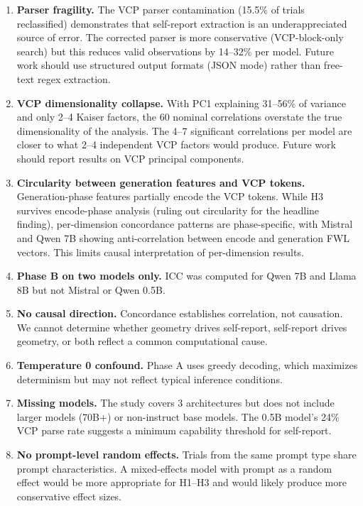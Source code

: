 \documentclass[11pt,a4paper]{article}
\begin{document}
\begin{enumerate}
    \item \textbf{Parser fragility.} The VCP parser contamination (15.5\% of trials reclassified) demonstrates that self-report extraction is an underappreciated source of error. The corrected parser is more conservative (VCP-block-only search) but this reduces valid observations by 14--32\% per model. Future work should use structured output formats (JSON mode) rather than free-text regex extraction.

    \item \textbf{VCP dimensionality collapse.} With PC1 explaining 31--56\% of variance and only 2--4 Kaiser factors, the 60 nominal correlations overstate the true dimensionality of the analysis. The 4--7 significant correlations per model are closer to what 2--4 independent VCP factors would produce. Future work should report results on VCP principal components.

    \item \textbf{Circularity between generation features and VCP tokens.} Generation-phase features partially encode the VCP tokens. While H3 survives encode-phase analysis (ruling out circularity for the headline finding), per-dimension concordance patterns are phase-specific, with Mistral and Qwen 7B showing anti-correlation between encode and generation FWL vectors. This limits causal interpretation of per-dimension results.

    \item \textbf{Phase B on two models only.} ICC was computed for Qwen 7B and Llama 8B but not Mistral or Qwen 0.5B.

    \item \textbf{No causal direction.} Concordance establishes correlation, not causation. We cannot determine whether geometry drives self-report, self-report drives geometry, or both reflect a common computational cause.

    \item \textbf{Temperature 0 confound.} Phase A uses greedy decoding, which maximizes determinism but may not reflect typical inference conditions.

    \item \textbf{Missing models.} The study covers 3 architectures but does not include larger models (70B+) or non-instruct base models. The 0.5B model's 24\% VCP parse rate suggests a minimum capability threshold for self-report.

    \item \textbf{No prompt-level random effects.} Trials from the same prompt type share prompt characteristics. A mixed-effects model with prompt as a random effect would be more appropriate for H1--H3 and would likely produce more conservative effect sizes.
\end{enumerate}
\end{document}
